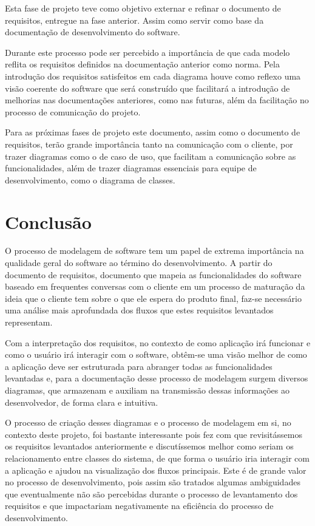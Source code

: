 \documentclass[12pt]{article}
\begin{document}
Esta fase de projeto teve como objetivo externar e refinar o documento de requisitos, entregue na fase anterior. Assim como servir como base da documentação de desenvolvimento do software. 

Durante este processo pode ser percebido a importância de que cada modelo reflita os requisitos definidos na documentação anterior como norma. Pela introdução dos requisitos satisfeitos em cada diagrama houve como reflexo uma visão coerente do software que será construído que facilitará a introdução de melhorias nas documentações anteriores, como nas futuras, além da facilitação no processo de comunicação do projeto. 

Para as próximas fases de projeto este documento, assim como o documento de requisitos, terão grande importância tanto na comunicação com o cliente, por trazer diagramas como o de caso de uso, que facilitam a comunicação sobre as funcionalidades, além de trazer diagramas essenciais para equipe de desenvolvimento, como o diagrama de classes.  

\section{Conclusão}
O processo de modelagem de software tem um papel de extrema importância na qualidade geral do software ao término do desenvolvimento. A partir do documento de requisitos, documento que mapeia as funcionalidades do software baseado em frequentes conversas com o cliente em um processo de maturação da ideia que o cliente tem sobre o que ele espera do produto final, faz-se necessário uma análise mais aprofundada dos fluxos que estes requisitos levantados representam.

Com a interpretação dos requisitos, no contexto de como aplicação irá funcionar e como o usuário irá interagir com o software, obtêm-se uma visão melhor de como a aplicação deve ser estruturada para abranger todas as funcionalidades levantadas e, para a documentação desse processo de modelagem surgem diversos diagramas, que armazenam e auxiliam na transmissão dessas informações ao desenvolvedor, de forma clara e intuitiva.

O processo de criação desses diagramas e o processo de modelagem em si, no contexto deste projeto, foi bastante interessante pois fez com que revisitássemos os requisitos levantados anteriormente e discutíssemos melhor como seriam os relacionamento entre classes do sistema, de que forma o usuário iria interagir com a aplicação e ajudou na visualização dos fluxos principais. Este é de grande valor no processo de desenvolvimento, pois assim são tratados algumas ambiguidades que eventualmente não são percebidas durante o processo de levantamento dos requisitos e que impactariam negativamente na eficiência do processo de desenvolvimento.
\end{document}
